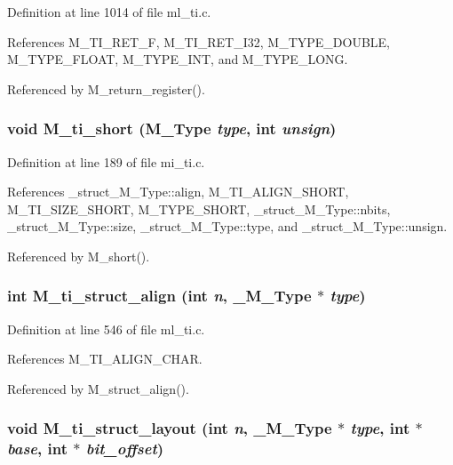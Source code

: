 Definition at line 1014 of file ml\_\-ti.c.

References M\_\-TI\_\-RET\_\-F, M\_\-TI\_\-RET\_\-I32, M\_\-TYPE\_\-DOUBLE, M\_\-TYPE\_\-FLOAT, M\_\-TYPE\_\-INT, and M\_\-TYPE\_\-LONG.

Referenced by M\_\-return\_\-register().
\subsubsection{\setlength{\rightskip}{0pt plus 5cm}void M\_\-ti\_\-short (\bf{M\_\-Type} {\em type}, int {\em unsign})}\label{m__ti_8h_46c798f6d62ac8121a16af9f953d1f26}




Definition at line 189 of file mi\_\-ti.c.

References \_\-struct\_\-M\_\-Type::align, M\_\-TI\_\-ALIGN\_\-SHORT, M\_\-TI\_\-SIZE\_\-SHORT, M\_\-TYPE\_\-SHORT, \_\-struct\_\-M\_\-Type::nbits, \_\-struct\_\-M\_\-Type::size, \_\-struct\_\-M\_\-Type::type, and \_\-struct\_\-M\_\-Type::unsign.

Referenced by M\_\-short().
\subsubsection{\setlength{\rightskip}{0pt plus 5cm}int M\_\-ti\_\-struct\_\-align (int {\em n}, \bf{\_\-M\_\-Type} $\ast$ {\em type})}\label{m__ti_8h_0ae9b98b22ea0685a343508bfdff0bd1}




Definition at line 546 of file ml\_\-ti.c.

References M\_\-TI\_\-ALIGN\_\-CHAR.

Referenced by M\_\-struct\_\-align().
\subsubsection{\setlength{\rightskip}{0pt plus 5cm}void M\_\-ti\_\-struct\_\-layout (int {\em n}, \bf{\_\-M\_\-Type} $\ast$ {\em type}, int $\ast$ {\em base}, int $\ast$ {\em bit\_\-offset})}\label{m__ti_8h_0e50d1deae194d6267b5bad9f369dd5c}




